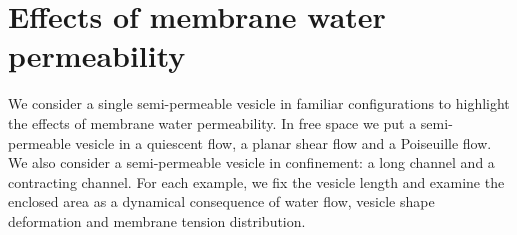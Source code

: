 \documentclass[9pt,twocolumn,twoside,lineno]{pnas-new}
\begin{document}
\section*{Effects of membrane water permeability}
We consider a single semi-permeable vesicle in familiar configurations to highlight the effects of membrane water permeability.
In free space we put a semi-permeable vesicle in a quiescent flow, a planar shear flow and a Poiseuille flow.
We also consider a semi-permeable vesicle in confinement: a long channel and a contracting channel.
For each example, we fix the vesicle length and examine the enclosed area as a dynamical consequence of water flow, vesicle shape deformation and membrane tension distribution.
%

\end{document}

